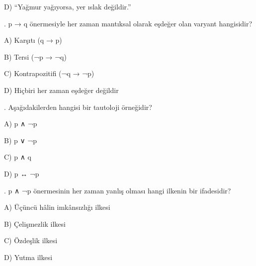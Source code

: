 \par\noindent\hspace*{1.6em}D) “Yağmur yağıyorsa, yer ıslak değildir.”

\par\smallskip{}. p → q önermesiyle her zaman mantıksal olarak eşdeğer olan varyant hangisidir?

\par\noindent\hspace*{1.6em}A) Karşıtı (q → p)

\par\noindent\hspace*{1.6em}B) Tersi (¬p → ¬q)

\par\noindent\hspace*{1.6em}C) Kontrapozitifi (¬q → ¬p)

\par\noindent\hspace*{1.6em}D) Hiçbiri her zaman eşdeğer değildir

\par\smallskip{}. Aşağıdakilerden hangisi bir tautoloji örneğidir?

\par\noindent\hspace*{1.6em}A) p ∧ ¬p

\par\noindent\hspace*{1.6em}B) p ∨ ¬p

\par\noindent\hspace*{1.6em}C) p ∧ q

\par\noindent\hspace*{1.6em}D) p ↔ ¬p

\par\smallskip{}. p ∧ ¬p önermesinin her zaman yanlış olması hangi ilkenin bir ifadesidir?

\par\noindent\hspace*{1.6em}A) Üçüncü hâlin imkânsızlığı ilkesi

\par\noindent\hspace*{1.6em}B) Çelişmezlik ilkesi

\par\noindent\hspace*{1.6em}C) Özdeşlik ilkesi

\par\noindent\hspace*{1.6em}D) Yutma ilkesi

